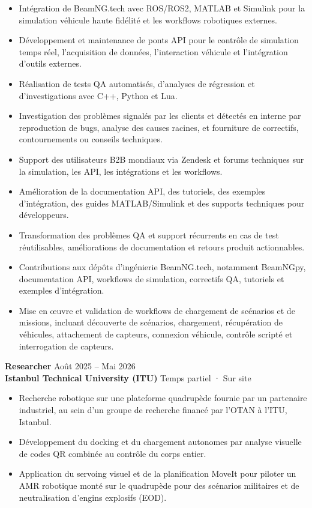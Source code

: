 \documentclass[11pt,a4paper]{article}
\begin{document}
\begin{itemize}
    \item Intégration de BeamNG.tech avec ROS/ROS2, MATLAB et Simulink pour la simulation véhicule haute fidélité et les workflows robotiques externes.
    \item Développement et maintenance de ponts API pour le contrôle de simulation temps réel, l'acquisition de données, l'interaction véhicule et l'intégration d'outils externes.
    \item Réalisation de tests QA automatisés, d'analyses de régression et d'investigations avec C++, Python et Lua.
    \item Investigation des problèmes signalés par les clients et détectés en interne par reproduction de bugs, analyse des causes racines, et fourniture de correctifs, contournements ou conseils techniques.
    \item Support des utilisateurs B2B mondiaux via Zendesk et forums techniques sur la simulation, les API, les intégrations et les workflows.
    \item Amélioration de la documentation API, des tutoriels, des exemples d'intégration, des guides MATLAB/Simulink et des supports techniques pour développeurs.
    \item Transformation des problèmes QA et support récurrents en cas de test réutilisables, améliorations de documentation et retours produit actionnables.
    \item Contributions aux dépôts d'ingénierie BeamNG.tech, notamment BeamNGpy, documentation API, workflows de simulation, correctifs QA, tutoriels et exemples d'intégration.
    \item Mise en œuvre et validation de workflows de chargement de scénarios et de missions, incluant découverte de scénarios, chargement, récupération de véhicules, attachement de capteurs, connexion véhicule, contrôle scripté et interrogation de capteurs.
\end{itemize}

\textbf{\color{PrimaryColor}Researcher} \hfill Août 2025 -- Mai 2026\\
\textbf{Istanbul Technical University (ITU)} \hfill Temps partiel · Sur site

\begin{itemize}
    \item Recherche robotique sur une plateforme quadrupède fournie par un partenaire industriel, au sein d'un groupe de recherche financé par l'OTAN à l'ITU, Istanbul.
    \item Développement du docking et du chargement autonomes par analyse visuelle de codes QR combinée au contrôle du corps entier.
    \item Application du servoing visuel et de la planification MoveIt pour piloter un AMR robotique monté sur le quadrupède pour des scénarios militaires et de neutralisation d'engins explosifs (EOD).
\end{itemize}
\end{document}
